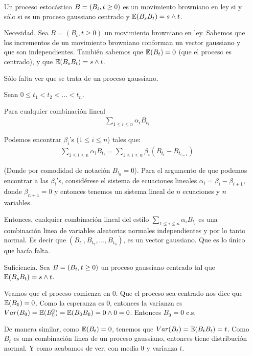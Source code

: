 \begin{problema}
	Un proceso estoc\'astico $B=\left( B_t,t\geq 0\right) $ es un movimiento 
	browniano en ley si y s\'olo si es un proceso gaussiano centrado y $\mathbb{E}\! \left( B_sB_t \right)=s\wedge t$. 
\end{problema}

\afterstatement\pn

Necesidad. Sea $B = (B_t, t \geq 0)$ un movimiento browniano en ley. Sabemos que los incrementos de un
movimiento browniano conforman un vector gaussiano y que son independientes. También sabemos que $\mathbb{E}(B_t) = 0$ (que el proceso es centrado), 
y que $\mathbb{E}(B_s B_t) = s \wedge t$.\pn

Sólo falta ver que se trata de un proceso gaussiano.\pn

Sean $0 \leq t_1 < t_2 < \dots < t_n$.\pn

Para cualquier combinación lineal 
\begin{align}
        \sum_{1 \leq i \leq n}  \alpha_i B_{t_i}
\end{align}\pn

Podemos encontrar $\beta_i$'s ($1 \leq i \leq n$) tales que:
\begin{align}
        \sum_{1 \leq i \leq n}  \alpha_i B_{t_i} = \sum_{1 \leq i \leq n}  \beta_i (B_{t_i} - B_{t_{i-1}}) 
\end{align}\pn

(Donde por comodidad de notación $B_{t_0} = 0$). Para el argumento de que podemos encontrar a las $\beta_i$'s, considérese el sistema
de ecuaciones lineales $\alpha_i = \beta_i - \beta_{i+1}$, donde $\beta_{n+1} = 0$ y entonces tenemos un sistema lineal de $n$ 
ecuaciones y $n$ variables.\pn

Entonces, cualquier combinación lineal del estilo $\sum_{1 \leq i \leq n}  \alpha_i B_{t_i}$ es una combinación linea de
variables aleatorias normales independientes y por lo tanto normal. Es decir que $(B_{t_1}, B_{t_2},\dots ,B_{t_n})$, es un vector gaussiano. Que es lo único
que hacía falta.\pn

Suficiencia. Sea $B =   \left( B_t,t\geq 0\right) $ un proceso gaussiano centrado tal que $\mathbb{E}(B_s B_t) = s \wedge t$.\pn

Veamos que el proceso comienza en $0$. Que el proceso sea centrado nos dice que $\mathbb{E}(B_0) = 0$. Como la esperanza es $0$, entonces
la varianza es $Var(B_0) = \mathbb{E}(B_0^2) = \mathbb{E}(B_0 B_0) = 0 \wedge 0 = 0$. Entonces $B_0 = 0$ c.s.\pn


De manera similar, como $\mathbb{E}(B_t) = 0$, tenemos que $Var(B_t) = \mathbb{E}(B_t B_t) = t$. Como $B_t$ es una combinación linea de un proceso gaussiano,
entonces tiene distribución normal. Y como acabamos de ver, con media 0 y varianza $t$.

